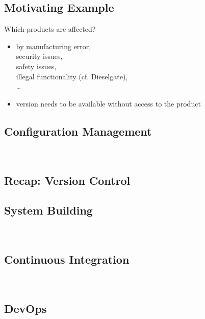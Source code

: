 \subsection{Motivating Example}
\begin{frame}{\insertsubsection}
	\begin{fancycolumns}[widths={66}]
	\nextcolumn
		\begin{example}{Which products are affected?}
			\begin{itemize}
				\item by manufacturing error,\\ security issues,\\ safety issues,\\ illegal functionality (cf. Dieselgate),\\ \ldots{}
				\item version needs to be available without access to the product
			\end{itemize}
		\end{example}
	\end{fancycolumns}
\end{frame}

\subsection{Configuration Management}
\begin{frame}{\insertsubsection\ \mytitlesource{\sommerville}}
	\slideConfigManagement
\end{frame}

\subsection{Recap: Version Control}
\begin{frame}{\insertsubsection}
	\slideVersionControl
\end{frame}

\subsection{System Building}
\begin{frame}{\insertsubsection\ \mytitlesource{\sommerville}}
	\frameSystemBuilding
\end{frame}

\subsection{Continuous Integration}
\begin{frame}{\insertsubsection\ \mytitlesource{\sommerville}}
	\frameContinousIntegration
\end{frame}

\slidecicd{}


\subsection{DevOps}
\begin{frame}{\insertsubsection\ \mytitlesource{\handbuch}}
	\frameDevOps
\end{frame}

\begin{frame}{\insertsubsection}
	\centering{}
\end{frame}

